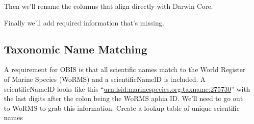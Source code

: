 \documentclass[
]{book}
\newenvironment{Shaded}{\begin{snugshade}}{\end{snugshade}}
\newcommand{\AttributeTok}[1]{\textcolor[rgb]{0.77,0.63,0.00}{#1}}
\newcommand{\ConstantTok}[1]{\textcolor[rgb]{0.00,0.00,0.00}{#1}}
\newcommand{\DecValTok}[1]{\textcolor[rgb]{0.00,0.00,0.81}{#1}}
\newcommand{\FunctionTok}[1]{\textcolor[rgb]{0.00,0.00,0.00}{#1}}
\newcommand{\NormalTok}[1]{#1}
\newcommand{\OtherTok}[1]{\textcolor[rgb]{0.56,0.35,0.01}{#1}}
\newcommand{\SpecialCharTok}[1]{\textcolor[rgb]{0.00,0.00,0.00}{#1}}
\newcommand{\StringTok}[1]{\textcolor[rgb]{0.31,0.60,0.02}{#1}}
\begin{document}
Then we'll rename the columns that align directly with Darwin Core.

\begin{Shaded}
\end{Shaded}

Finally we'll add required information that's missing.

\begin{Shaded}
\end{Shaded}

\hypertarget{taxonomic-name-matching}{%
\subsection{Taxonomic Name Matching}\label{taxonomic-name-matching}}

A requirement for OBIS is that all scientific names match to the World Register of
Marine Species (WoRMS) and a scientificNameID is included. A scientificNameID looks
like this ``\url{urn:lsid:marinespecies.org:taxname:275730}'' with the last digits after
the colon being the WoRMS aphia ID. We'll need to go out to WoRMS to grab this
information.
Create a lookup table of unique scientific names

\begin{Shaded}
\end{Shaded}
\end{document}

